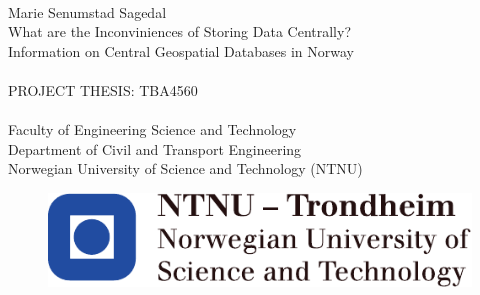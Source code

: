 \thispagestyle{empty}
\mbox{}\\[6pc]

\noindent\Large{Marie Senumstad Sagedal}\\[4pc]
\Huge{What are the Inconviniences of Storing Data Centrally?}\\[1pc]
\Large{Information on Central Geospatial Databases in Norway}\\[5pc]
\\[2pc]
PROJECT THESIS: TBA4560\\
\\[2pc]
Faculty of Engineering Science and Technology\\
Department of Civil and Transport Engineering\\
Norwegian University of Science and Technology (NTNU)
\begin{figure}[b!]
   \includegraphics[scale=1.0]{img/NTNU}
\end{figure}

\vfill



